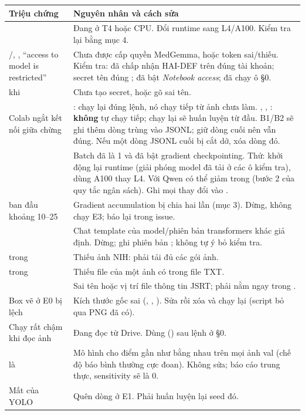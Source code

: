 \begin{center}
\small
\begin{longtable}{@{}P{5.0cm}P{9.6cm}@{}}
\toprule
\textbf{Triệu chứng} & \textbf{Nguyên nhân và cách sửa} \\
\midrule\endhead
{} & Đang ở T4 hoặc CPU. Đổi runtime sang L4/A100. Kiểm tra lại bằng mục 4. \\
/, , ``access to model is restricted'' & Chưa được cấp quyền MedGemma, hoặc token sai/thiếu. Kiểm tra: đã chấp nhận HAI-DEF trên đúng tài khoản; secret tên đúng ; đã bật \emph{Notebook access}; đã chạy ô §0. \\
 khi  & Chưa tạo secret, hoặc gõ sai tên. \\
Colab ngắt kết nối giữa chừng & : chạy lại đúng lệnh, nó chạy tiếp từ ảnh chưa làm. , , : \textbf{không} tự chạy tiếp; chạy lại sẽ huấn luyện từ đầu. B1/B2 sẽ ghi thêm dòng trùng vào JSONL;  giữ dòng cuối nên vẫn đúng. Nếu một dòng JSONL cuối bị cắt dở, xóa dòng đó. \\
 & Batch đã là 1 và đã bật gradient checkpointing. Thử: khởi động lại runtime (giải phóng model đã tải ở các ô kiểm tra), dùng A100 thay L4. Với Qwen có thể giảm  trong  (bước 2 của quy tắc ngân sách). Ghi mọi thay đổi vào . \\
 ban đầu khoảng 10--25 & Gradient accumulation bị chia hai lần (mục 3). Dừng, không chạy E3; báo lại trong issue. \\
 & Chat template của model/phiên bản transformers khác giả định. Dừng; ghi phiên bản ; không tự ý bỏ kiểm tra. \\
 trong  & Thiếu ảnh NIH: phải tải đủ các gói ảnh. \\
 trong  & Thiếu file  của một ảnh có trong file TXT. \\
 & Sai tên hoặc vị trí file thông tin JSRT; phải nằm ngay trong . \\
Box vẽ ở E0 bị lệch & Kích thước gốc sai (, , ). Sửa rồi xóa  và chạy lại (script bỏ qua PNG đã có). \\
Chạy rất chậm khi đọc ảnh & Đang đọc từ Drive. Dùng  () sau lệnh  ở §0. \\
 là  & Mô hình cho điểm gần như bằng nhau trên mọi ảnh val (chế độ báo bình thường cực đoan). Không sửa; báo cáo trung thực, sensitivity sẽ là 0. \\
Mất  của YOLO & Quên dòng  ở E1. Phải huấn luyện lại seed đó. \\
\bottomrule
\end{longtable}
\end{center}

